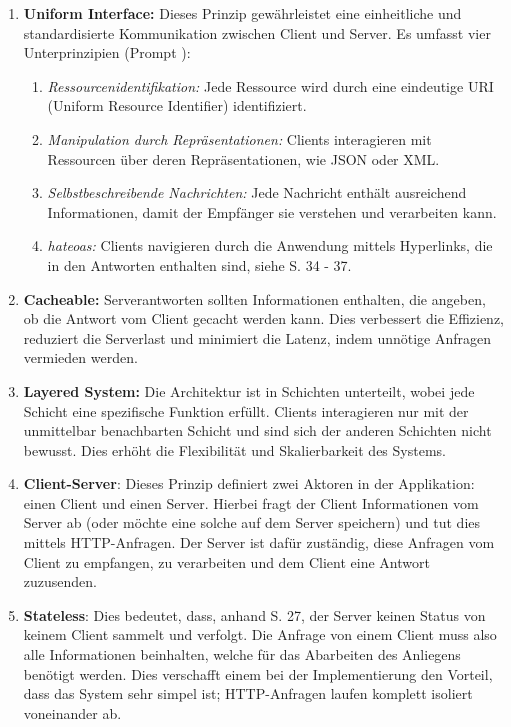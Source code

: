 \begin{enumerate}
    \item \textbf{Uniform Interface:} Dieses Prinzip gewährleistet eine einheitliche und standardisierte Kommunikation zwischen Client und Server. Es umfasst vier Unterprinzipien (Prompt \cite{prompt-gpt-rest}):
    \begin{enumerate}
        \item \textit{Ressourcenidentifikation:} Jede Ressource wird durch eine eindeutige URI (Uniform Resource Identifier) identifiziert.
        \item \textit{Manipulation durch Repräsentationen:} Clients interagieren mit Ressourcen über deren Repräsentationen, wie JSON oder XML.
        \item \textit{Selbstbeschreibende Nachrichten:} Jede Nachricht enthält ausreichend Informationen, damit der Empfänger sie verstehen und verarbeiten kann.
        \item \textit{\gls{hateoas}:} Clients navigieren durch die Anwendung mittels Hyperlinks, die in den Antworten enthalten sind, siehe \cite{book-modern-api-development-packt} S. 34 - 37.
    \end{enumerate}

    \item \textbf{Cacheable:} Serverantworten sollten Informationen enthalten, die angeben, ob die Antwort vom Client gecacht werden kann. Dies verbessert die Effizienz, reduziert die Serverlast und minimiert die Latenz, indem unnötige Anfragen vermieden werden.

    \item \textbf{Layered System:} Die Architektur ist in Schichten unterteilt, wobei jede Schicht eine spezifische Funktion erfüllt. Clients interagieren nur mit der unmittelbar benachbarten Schicht und sind sich der anderen Schichten nicht bewusst. Dies erhöht die Flexibilität und Skalierbarkeit des Systems.

    \item \textbf{Client-Server}: Dieses Prinzip definiert zwei Aktoren in der Applikation: einen Client und einen Server. Hierbei fragt der Client Informationen vom Server ab (oder möchte eine solche auf dem Server speichern) und tut dies mittels HTTP-Anfragen. Der Server ist dafür zuständig, diese Anfragen vom Client zu empfangen, zu verarbeiten und dem Client eine Antwort zuzusenden.
    \item \textbf{Stateless}: Dies bedeutet, dass, anhand \cite{book-modern-api-development-packt} S. 27, der Server keinen Status von keinem Client  sammelt und verfolgt. Die Anfrage von einem Client muss also alle Informationen beinhalten, welche für das Abarbeiten des Anliegens benötigt werden. Dies verschafft einem bei der Implementierung den Vorteil, dass das System sehr simpel ist; HTTP-Anfragen laufen komplett isoliert voneinander ab.
\end{enumerate}
 

